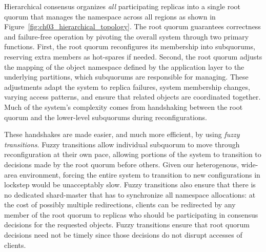 Hierarchical consensus organizes \emph{all} participating replicas into a single root quorum that manages the namespace across all regions as shown in Figure~\ref{fig:ch03_hierarchical_topology}.
The root quorum guarantees correctness and failure-free operation by pivoting the overall system through two primary functions.
First, the root quorum reconfigures its membership into subquorums, reserving extra members as hot-spares if needed.
Second, the root quorum adjusts the mapping of the object namespace defined by the application layer to the underlying partitions, which subquorums are responsible for managing.
These adjustments adapt the system to replica failures, system membership changes, varying access patterns, and ensure that related objects are coordinated together.
Much of the system's complexity comes from handshaking between the root quorum and the lower-level subquorums during reconfigurations.


These handshakes are made easier, and much more efficient, by using \emph{fuzzy transitions}.
Fuzzy transitions allow individual subquorum to move through reconfiguration at their own pace, allowing portions of the system to transition to decisions made by the root quorum before others.
Given our heterogenous, wide-area environment, forcing the entire system to transition to new configurations in lockstep would be unacceptably slow.
Fuzzy transitions also ensure that there is no dedicated shard-master that has to synchronize all namespace allocations: at the cost of possibly multiple  redirections, clients can be redirected by any member of the root quorum to replicas who should be participating in consensus decisions for the requested objects.
Fuzzy transitions ensure that root quorum decisions need not be timely since those decisions do not disrupt accesses of clients.

